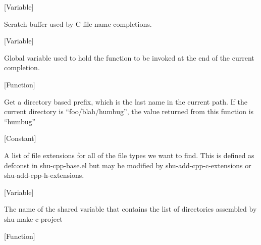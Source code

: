 \vspace{1em}
\noindent
{}
\usebox{\funcname}
 \hfill [Variable]

\begin{doc-string}
Scratch buffer used by C file name completions.
\end{doc-string}

\vspace{1em}
\noindent
{}
\usebox{\funcname}
 \hfill [Variable]

\begin{doc-string}
Global variable used to hold the function to be invoked at the end of the
current completion.
\end{doc-string}

\vspace{1em}
\noindent
{}
\usebox{\funcname}
 \hfill [Function]

\begin{doc-string}
Get a directory based prefix, which is the last name in the current path.  If the current
directory is ``foo/blah/humbug'', the value returned from this function is ``humbug''
\end{doc-string}

\vspace{1em}
\noindent
{}
\usebox{\funcname}
 \hfill [Constant]

\begin{doc-string}
A list of file extensions for all of the file types we want to find.  This is defined
as defconst in shu-cpp-base.el but may be modified by shu-add-cpp-c-extensions or
shu-add-cpp-h-extensions.
\end{doc-string}

\vspace{1em}
\noindent
{}
\usebox{\funcname}
 \hfill [Variable]

\begin{doc-string}
The name of the shared variable that contains the list of directories assembled
by shu-make-c-project
\end{doc-string}

\vspace{1em}
\noindent
{}
\usebox{\funcname}
 \hfill [Function]

